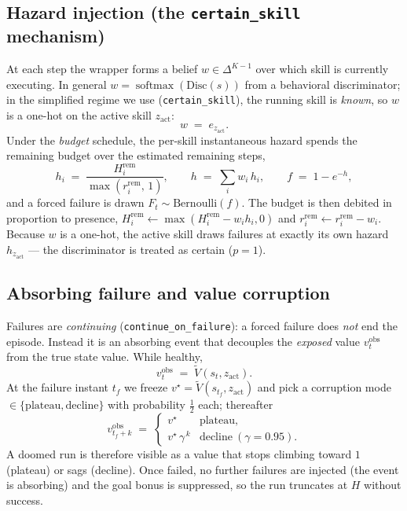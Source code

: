 \documentclass[11pt]{article}
\newcommand{\st}{s}
\newcommand{\Vnorm}{\widetilde{V}}
\newcommand{\skill}{z}
\newcommand{\softmax}{\operatorname{softmax}}
\newcommand{\Bern}{\mathrm{Bernoulli}}
\newcommand{\code}[1]{\texttt{\small #1}}
\begin{document}
\subsection{Hazard injection (the \texttt{certain\_skill} mechanism)}
At each step the wrapper forms a belief $w\in\Delta^{K-1}$ over which skill is
currently executing. In general $w=\softmax(\text{Disc}(\st))$ from a behavioral
discriminator; in the simplified regime we use (\code{certain\_skill}), the running
skill is \emph{known}, so $w$ is a one-hot on the active skill $\skill_{\mathrm{act}}$:
\begin{equation}
w \;=\; e_{\skill_{\mathrm{act}}}.
\end{equation}
Under the \emph{budget} schedule, the per-skill instantaneous hazard spends the
remaining budget over the estimated remaining steps,
\begin{equation}
h_i \;=\; \frac{H^{\mathrm{rem}}_i}{\max(r^{\mathrm{rem}}_i,\, 1)},\qquad
h \;=\; \textstyle\sum_i w_i\, h_i,\qquad
f \;=\; 1-e^{-h},
\end{equation}
and a forced failure is drawn $F_t\sim\Bern(f)$. The budget is then debited in
proportion to presence, $H^{\mathrm{rem}}_i \leftarrow \max(H^{\mathrm{rem}}_i - w_i
h_i,0)$ and $r^{\mathrm{rem}}_i \leftarrow r^{\mathrm{rem}}_i - w_i$. Because $w$ is a
one-hot, the active skill draws failures at exactly its own hazard $h_{\skill_{\mathrm
{act}}}$ --- the discriminator is treated as certain ($p=1$).

\subsection{Absorbing failure and value corruption}
Failures are \emph{continuing} (\code{continue\_on\_failure}): a forced failure does
\emph{not} end the episode. Instead it is an absorbing event that decouples the
\emph{exposed} value $v^{\mathrm{obs}}_t$ from the true state value. While healthy,
\begin{equation}
v^{\mathrm{obs}}_t \;=\; \Vnorm(\st_t,\skill_{\mathrm{act}}).
\end{equation}
At the failure instant $t_f$ we freeze $v^\star=\Vnorm(\st_{t_f},\skill_{\mathrm{act}})$
and pick a corruption mode $\in\{\text{plateau},\text{decline}\}$ with probability
$\tfrac12$ each; thereafter
\begin{equation}
v^{\mathrm{obs}}_{t_f+k} \;=\;
\begin{cases}
v^\star & \text{plateau},\\[2pt]
v^\star\,\gamma^{\,k} & \text{decline}\ (\gamma=0.95).
\end{cases}
\label{eq:corrupt}
\end{equation}
A doomed run is therefore visible as a value that stops climbing toward $1$ (plateau)
or sags (decline). Once failed, no further failures are injected (the event is
absorbing) and the goal bonus is suppressed, so the run truncates at $H$ without
success.
\end{document}
